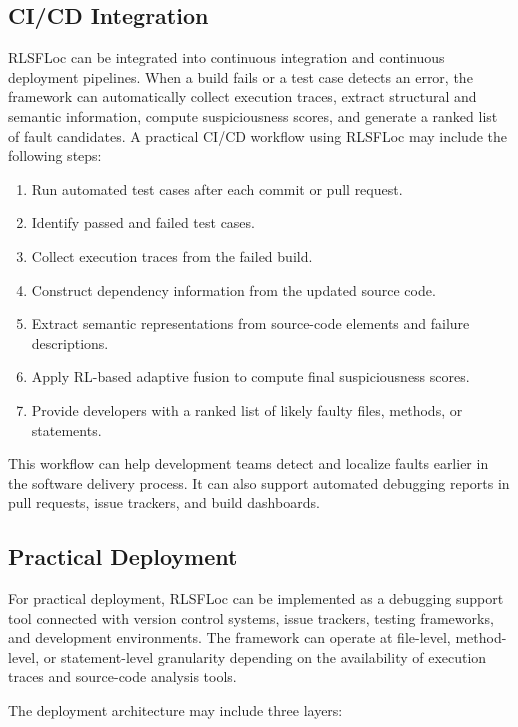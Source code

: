 \documentclass[article,article,submit,pdftex,moreauthors]{Definitions/mdpi}
\begin{document}
\subsection{CI/CD Integration}

RLSFLoc can be integrated into continuous integration and continuous deployment pipelines. When a build fails or a test case detects an error, the framework can automatically collect execution traces, extract structural and semantic information, compute suspiciousness scores, and generate a ranked list of fault candidates. A practical CI/CD workflow using RLSFLoc may include the following steps:

\begin{enumerate}
    \item Run automated test cases after each commit or pull request.
    \item Identify passed and failed test cases.
    \item Collect execution traces from the failed build.
    \item Construct dependency information from the updated source code.
    \item Extract semantic representations from source-code elements and failure descriptions.
    \item Apply RL-based adaptive fusion to compute final suspiciousness scores.
    \item Provide developers with a ranked list of likely faulty files, methods, or statements.
\end{enumerate}

This workflow can help development teams detect and localize faults earlier in the software delivery process. It can also support automated debugging reports in pull requests, issue trackers, and build dashboards.

\subsection{Practical Deployment}

For practical deployment, RLSFLoc can be implemented as a debugging support tool connected with version control systems, issue trackers, testing frameworks, and development environments. The framework can operate at file-level, method-level, or statement-level granularity depending on the availability of execution traces and source-code analysis tools.

The deployment architecture may include three layers:
\end{document}
